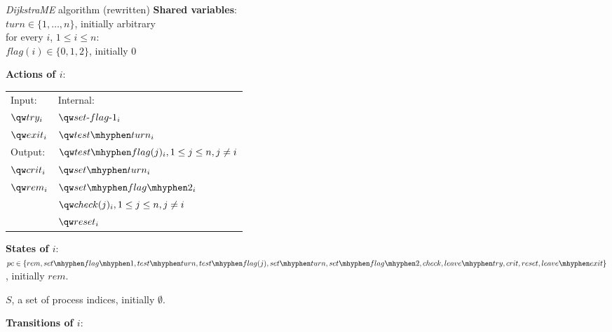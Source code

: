 \documentclass[11pt]{article}
\def \rem {rem}
\def \setflagi {set\mhyphen flag\mhyphen 1}
\def \setflagii {set\mhyphen flag\mhyphen 2}
\def \testturn {test\mhyphen turn}
\def \testflag {test\mhyphen flag}
\def \setturn {set\mhyphen turn}
\def \leavetry {leave\mhyphen try}
\def \leaveexit {leave\mhyphen exit}
\begin{document}
\begin{Block}{\textit{DijkstraME} algorithm (rewritten)}
\textbf{Shared variables}:\\
\(turn\in\{1,\dots,n\}\), initially arbitrary\\
for every \(i\), \(1\le i\le n\):\\
\indent\(flag(i)\in\{0,1,2\}\), initially 0

\noindent \textbf{Actions of \(i\)}:\\
\begin{tabular}{ll}
Input:\hspace{3cm} & Internal:\\
\(\qw try_i\) & \(\qw set\text{-}flag\text{-}1_i\)\\
\(\qw exit_i\) & \(\qw test\mhyphen turn_i\)\\
Output: & \(\qw test\mhyphen flag(j)_i,1\le j\le n,j\neq i\)\\
\(\qw crit_i\) & \(\qw set\mhyphen turn_i\)\\
\(\qw rem_i\) & \(\qw set\mhyphen flag\mhyphen 2_i\)\\
 & \(\qw check(j)_i,1\le j\le n,j\neq i\)\\
 & \(\qw reset_i\)\\
\end{tabular}


\noindent \textbf{States of \(i\)}:\\
\(pc\in\{\rem,\setflagi,\testturn,\testflag(j),\setturn,\allowbreak \setflagii,check,\\\leavetry,crit,reset,\leaveexit\}\),
initially \(rem\).

\(S\), a set of process indices, initially \(\emptyset\).

\noindent \textbf{Transitions of \(i\)}:


\end{Block}
\end{document}
